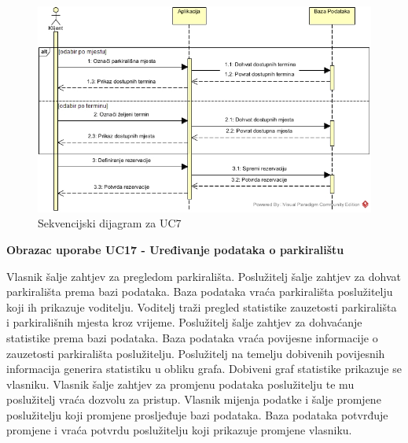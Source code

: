 \vspace{1cm}

\begin{figure}[H]
\centering
\includegraphics[width=\textwidth]{slike/SD_UC7.JPG} 
\caption{Sekvencijski dijagram za UC7}
\label{fig:promjene10} 
\end{figure}

\vspace{1cm}

\textbf {Obrazac uporabe UC17 - Uređivanje podataka o parkiralištu}

\vspace{1cm}

Vlasnik šalje zahtjev za pregledom parkirališta. Poslužitelj šalje zahtjev za dohvat parkirališta prema bazi podataka. Baza podataka vraća parkirališta poslužitelju koji ih prikazuje voditelju. Voditelj traži pregled statistike zauzetosti parkirališta i parkirališnih mjesta kroz vrijeme. Poslužitelj šalje zahtjev za dohvaćanje statistike prema bazi podataka. Baza podataka vraća povijesne informacije o zauzetosti parkirališta poslužitelju. Poslužitelj na temelju dobivenih povijesnih informacija generira statistiku u obliku grafa. Dobiveni graf statistike prikazuje se vlasniku. Vlasnik šalje zahtjev za promjenu podataka poslužitelju te mu poslužitelj vraća dozvolu za pristup. Vlasnik mijenja podatke i šalje promjene poslužitelju koji promjene prosljeđuje bazi podataka. Baza podataka potvrđuje promjene i vraća potvrdu poslužitelju koji prikazuje promjene vlasniku.

\vspace{1cm}

